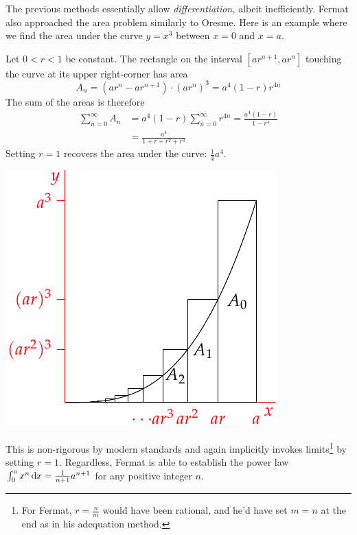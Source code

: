 
The previous methods essentially allow \emph{differentiation,} albeit inefficiently. Fermat also approached the area problem similarly to Oresme. Here is an example where we find the area under the curve $y=x^3$ between $x=0$ and $x=a$.

\begin{minipage}[t]{0.59\linewidth}\vspace{0pt}
Let $0<r<1$ be constant. The rectangle on the interval $[ar^{n+1},ar^n]$ touching the curve at its upper right-corner has area
\[A_n=(ar^n-ar^{n+1})\cdot (ar^n)^3=a^4(1-r)r^{4n}\]
The sum of the areas is therefore
\begin{align*}
\sum_{n=0}^\infty A_n&=a^4(1-r)\sum_{n=0}^\infty r^{4n}=\frac{a^4(1-r)}{1-r^4}\\
&=\frac{a^4}{1+r+r^2+r^3}
\end{align*}
Setting $r=1$ recovers the area under the curve: $\frac 14a^4$.
\end{minipage}\hfill\begin{minipage}[t]{0.4\linewidth}\vspace{0pt}
\flushright\includegraphics{analytic-fermat-area}
\end{minipage}
\medbreak

This is non-rigorous by modern standards and again implicitly invokes limits\footnote{For Fermat, $r=\frac nm$ would have been rational, and he'd have set $m=n$ at the end as in his adequation method.} by setting $r=1$. Regardless, Fermat is able to establish the power law $\int_0^a x^n\,{\mathrm{d} x}=\frac 1{n+1}a^{n+1}$ for any positive integer $n$.


